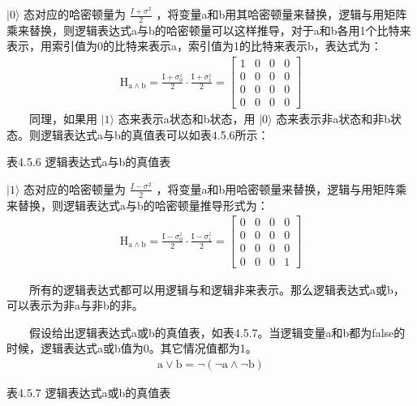 \documentclass[a4paper,11pt,english]{sphinxmanual}
\begin{document}
\sphinxAtStartPar
\(|0\rangle\) 态对应的哈密顿量为 \(\frac{I+\sigma^{2}}{2}\) ，将变量a和b用其哈密顿量来替换，逻辑与用矩阵乘来替换，则逻辑表达式a与b的哈密顿量可以这样推导，对于a和b各用1个比特来表示，用索引值为0的比特来表示a，索引值为1的比特来表示b，表达式为：
\begin{equation*}
\begin{split}\mathrm{H}_{\mathrm{a} \land \mathrm{b}}=\frac{\mathrm{I}+\sigma_{0}^{z}}{2} \cdot \frac{\mathrm{I}+\sigma_{1}^{z}}{2}=\left[\begin{array}{llll} 1 & 0 & 0 & 0 \\ 0 & 0 & 0 & 0 \\ 0 & 0 & 0 & 0 \\ 0 & 0 & 0 & 0 \end{array}\right]\end{split}
\end{equation*}
\sphinxAtStartPar
  同理，如果用 \(|1\rangle\) 态来表示a状态和b状态，用 \(|0\rangle\) 态来表示非a状态和非b状态。则逻辑表达式a与b的真值表可以如表4.5.6所示：

\begin{center}表4.5.6 逻辑表达式a与b的真值表
\end{center}

\sphinxAtStartPar
\(|1 \rangle\) 态对应的哈密顿量为 \(\frac{I-\sigma^{2}}{2}\) ，将变量a和b用哈密顿量来替换，逻辑与用矩阵乘来替换，则逻辑表达式a与b的哈密顿量推导形式为：
\begin{equation*}
\begin{split}\mathrm{H}_{\mathrm{a} \land \mathrm{b}}=\frac{\mathrm{I}-\sigma_{0}^{z}}{2} \cdot \frac{\mathrm{I}-\sigma_{1}^{z}}{2}=\left[\begin{array}{llll} 0 & 0 & 0 & 0 \\ 0 & 0 & 0 & 0 \\ 0 & 0 & 0 & 0 \\ 0 & 0 & 0 & 1 \end{array}\right]\end{split}
\end{equation*}
\sphinxAtStartPar
{}

\sphinxAtStartPar
  所有的逻辑表达式都可以用逻辑与和逻辑非来表示。那么逻辑表达式a或b，可以表示为非a与非b的非。

\sphinxAtStartPar
  假设给出逻辑表达式a或b的真值表，如表4.5.7。当逻辑变量a和b都为false的时候，逻辑表达式a或b值为0。其它情况值都为1。
\begin{equation*}
\begin{split}\mathrm{a} \lor \mathrm{b}=\neg(\neg \mathrm{a} \wedge \neg \mathrm{b})\end{split}
\end{equation*}
\begin{center}表4.5.7 逻辑表达式a或b的真值表
\end{center}
\end{document}
